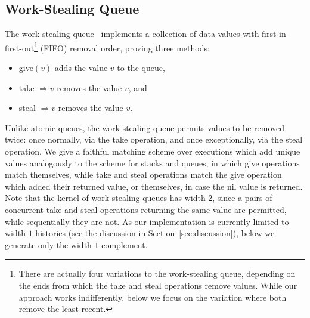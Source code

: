 \subsection{Work-Stealing Queue}

The work-stealing queue~\cite{journals/dc/HendlerLMS06} implements a collection
of data values with first-in-first-out\footnote{There are actually four
variations to the work-stealing queue, depending on the ends from which the
take and steal operations remove values. While our approach works
indifferently, below we focus on the variation where both remove the least
recent.} (FIFO) removal order, proving three methods:
\begin{itemize}

  \item give$(v)$ adds the value $v$ to the queue,

  \item take $\Rightarrow v$ removes the value $v$, and

  \item steal $\Rightarrow v$ removes the value $v$.

\end{itemize}
Unlike atomic queues, the work-stealing queue permits values to be removed
twice: once normally, via the take operation, and once exceptionally, via the
steal operation. We give a faithful matching scheme over executions which add
unique values analogously to the scheme for stacks and queues, in which give
operations match themselves, while take and steal operations match the give
operation which added their returned value, or themselves, in case the nil
value is returned. Note that the kernel of work-stealing queues has width $2$,
since a pairs of concurrent take and steal operations returning the same value
are permitted, while sequentially they are not. As our implementation is
currently limited to width-$1$ histories (see the discussion in
Section~\ref{sec:discussion}), below we generate only the width-$1$ complement.

